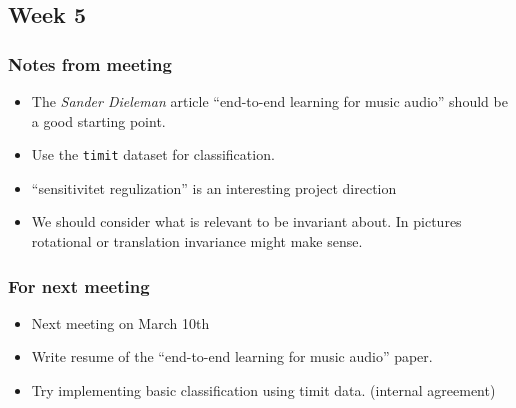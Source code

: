
\subsection{Week 5}

\subsubsection{Notes from meeting}

\begin{itemize}
\item The \textit{Sander Dieleman} article ``end-to-end learning for music
audio'' should be a good starting point.
\item Use the \texttt{timit} dataset for classification.
\item ``sensitivitet regulization'' is an interesting project direction
\item We should consider what is relevant to be invariant about. In pictures
rotational or translation invariance might make sense.
\end{itemize}

\subsubsection{For next meeting}

\begin{itemize}
\item Next meeting on March 10th
\item Write resume of the ``end-to-end learning for music audio'' paper.
\item Try implementing basic classification using timit data. (internal
agreement)
\end{itemize}
